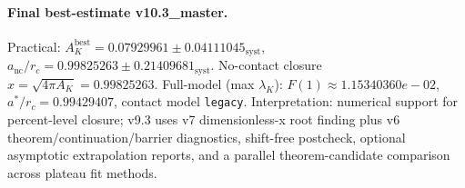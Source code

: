\paragraph{Final best-estimate v10.3_master.}
Practical: $A_K^{\mathrm{best}} = 0.07929961 \pm 0.04111045_{\mathrm{syst}}$, $a_{\mathrm{nc}}/r_c = 0.99825263 \pm 0.21409681_{\mathrm{syst}}$.
No-contact closure $x = \sqrt{4\pi A_K} = 0.99825263$.
Full-model (max $\lambda_K$): $F(1) \approx 1.15340360e-02$, $a^*/r_c = 0.99429407$, contact model \texttt{legacy}.
Interpretation: numerical support for percent-level closure; v9.3 uses v7 dimensionless-x root finding plus v6 theorem/continuation/barrier diagnostics, shift-free postcheck, optional asymptotic extrapolation reports, and a parallel theorem-candidate comparison across plateau fit methods.
